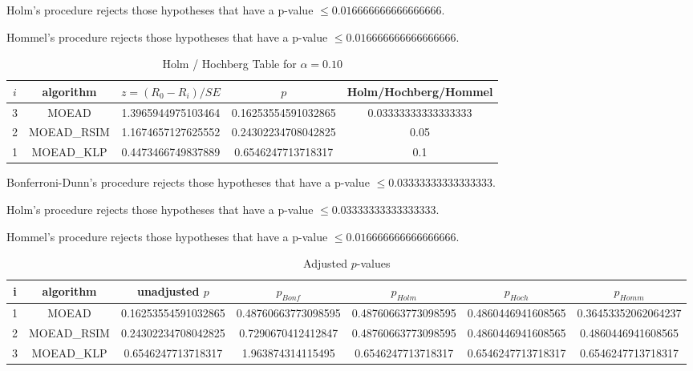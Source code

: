 \documentclass[a4paper,10pt]{article}
\begin{document}
\begin{landscape}
Holm's procedure rejects those hypotheses that have a p-value $\le0.016666666666666666$.


Hommel's procedure rejects those hypotheses that have a p-value $\le0.016666666666666666$.


\begin{table}[!htp]
\centering\tiny
\caption{Holm / Hochberg Table for $\alpha=0.10$}
\begin{tabular}{ccccc}
$i$&algorithm&$z=(R_0 - R_i)/SE$&$p$&Holm/Hochberg/Hommel\\
\hline
3&MOEAD&1.3965944975103464&0.16253554591032865&0.03333333333333333\\
2&MOEAD_RSIM&1.1674657127625552&0.24302234708042825&0.05\\
1&MOEAD_KLP&0.4473466749837889&0.6546247713718317&0.1\\
\hline
\end{tabular}
\end{table}
Bonferroni-Dunn's procedure rejects those hypotheses that have a p-value $\le0.03333333333333333$.


Holm's procedure rejects those hypotheses that have a p-value $\le0.03333333333333333$.


Hommel's procedure rejects those hypotheses that have a p-value $\le0.016666666666666666$.


\begin{table}[!htp]
\centering\tiny
\caption{Adjusted $p$-values}
\begin{tabular}{ccccccc}
i&algorithm&unadjusted $p$&$p_{Bonf}$&$p_{Holm}$&$p_{Hoch}$&$p_{Homm}$\\
\hline
1&MOEAD&0.16253554591032865&0.48760663773098595&0.48760663773098595&0.4860446941608565&0.36453352062064237\\
2&MOEAD_RSIM&0.24302234708042825&0.7290670412412847&0.48760663773098595&0.4860446941608565&0.4860446941608565\\
3&MOEAD_KLP&0.6546247713718317&1.963874314115495&0.6546247713718317&0.6546247713718317&0.6546247713718317\\
\hline
\end{tabular}
\end{table}


\end{landscape}
\end{document}
